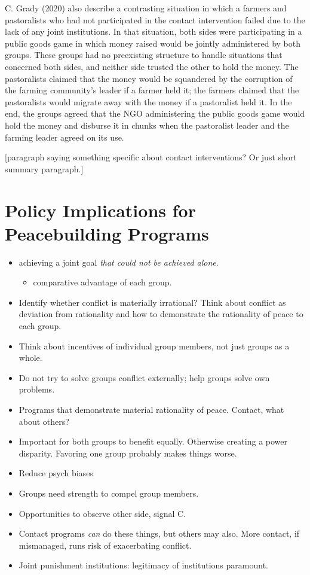 \documentclass[11pt]{article}
\providecommand{\tightlist}{%
  \setlength{\itemsep}{0pt}\setlength{\parskip}{0pt}}
\begin{document}
C. Grady (2020) also describe a contrasting situation in which a farmers
and pastoralists who had not participated in the contact intervention
failed due to the lack of any joint institutions. In that situation,
both sides were participating in a public goods game in which money
raised would be jointly administered by both groups. These groups had no
preexisting structure to handle situations that concerned both sides,
and neither side trusted the other to hold the money. The pastoralists
claimed that the money would be squandered by the corruption of the
farming community's leader if a farmer held it; the farmers claimed that
the pastoralists would migrate away with the money if a pastoralist held
it. In the end, the groups agreed that the NGO administering the public
goods game would hold the money and disburse it in chunks when the
pastoralist leader and the farming leader agreed on its use.

{[}paragraph saying something specific about contact interventions? Or
just short summary paragraph.{]}

\hypertarget{policy-implications-for-peacebuilding-programs}{%
\section{Policy Implications for Peacebuilding
Programs}\label{policy-implications-for-peacebuilding-programs}}

\begin{itemize}
\item
  achieving a joint goal \emph{that could not be achieved alone}.

  \begin{itemize}
  \tightlist
  \item
    comparative advantage of each group.
  \end{itemize}
\item
  Identify whether conflict is materially irrational? Think about
  conflict as deviation from rationality and how to demonstrate the
  rationality of peace to each group.
\item
  Think about incentives of individual group members, not just groups as
  a whole.
\item
  Do not try to solve groups conflict externally; help groups solve own
  problems.
\item
  Programs that demonstrate material rationality of peace. Contact, what
  about others?
\item
  Important for both groups to benefit equally. Otherwise creating a
  power disparity. Favoring one group probably makes things worse.
\item
  Reduce psych biases
\item
  Groups need strength to compel group members.
\item
  Opportunities to observe other side, signal C.
\item
  Contact programs \emph{can} do these things, but others may also. More
  contact, if mismanaged, runs risk of exacerbating conflict.
\item
  Joint punishment institutions: legitimacy of institutions paramount.
\end{itemize}
\end{document}
